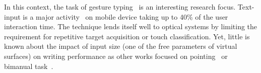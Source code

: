 \documentclass{chi-ext}
\begin{document}

In this context, the task of gesture typing~\cite{Kristensson2004} is an interesting research focus. Text-input is a major activity~\cite{McGregor2014} on mobile device taking up to 40\% of the user interaction time. The technique lends itself well to optical systems by limiting the requirement for repetitive target acquisition or touch classification. Yet, little is known about the impact of input size (one of the free parameters of virtual surfaces) on writing performance as other works focused on pointing~\cite{Casiez2008,Gilliot2014} or bimanual task~\cite{Schmidt2009}.
\end{document}
